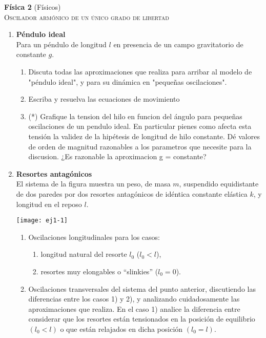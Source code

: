\documentclass[11pt,spanish,a4paper]{article}
\begin{document}
\begin{center}
\textbf{Física 2} (Físicos) \hfill {}\\
	\textsc{\LARGE Oscilador armónico de un único grado de libertad}\\
\end{center}


\begin{enumerate}

\item 
\textbf{Péndulo ideal}\\
Para un péndulo de longitud $l$ en presencia de un campo gravitatorio de constante $g$.
\begin{enumerate}
	\item Discuta todas las aproximaciones que realiza para arribar al modelo de "péndulo ideal", y para su dinámica en "pequeñas oscilaciones".
	\item Escriba y resuelva las ecuaciones de movimiento 
	\item (*) Grafique la tension del hilo en funcion del ángulo para pequeñas oscilaciones de un pendulo ideal.
	En particular pienes como afecta esta tensión la validez de la hipétesis de longitud de hilo constante.
	Dé valores de orden de magnitud razonables a los parametros que necesite para la discusion.
	¿Es razonable la aproximacion g = constante?
\end{enumerate}


\item
\begin{minipage}[t][1.9cm]{0.6\textwidth}
\textbf{Resortes antagónicos}\\
El sistema de la figura muestra un peso, de masa $m$, suspendido equidistante de dos paredes por dos resortes antagónicos de idéntica constante elástica $k$, y longitud en el reposo $l$.
\end{minipage}
\begin{minipage}[c][0cm][t]{0.3\textwidth}
  \texttt{[image: ej1-1]}
\end{minipage}
\begin{enumerate}
	\item Oscilaciones longitudinales para los casos:   
	\begin{enumerate}
		\item longitud natural del resorte $l_0$ ($l_0 < l$),   
		\item resortes muy elongables o ``slinkies'' ($l_0 = 0$).   
	\end{enumerate}
	\item Oscilaciones transversales del sistema del punto anterior, discutiendo las diferencias entre los casos 1) y 2), y analizando cuidadosamente las aproximaciones que realiza.
	En el caso 1) analice la diferencia entre considerar que los resortes están tensionados en la posición de equilibrio $(l_{0}<l)$ o que están relajados en dicha posición $(l_0= l)$.
\end{enumerate}




\end{enumerate}
\end{document}
